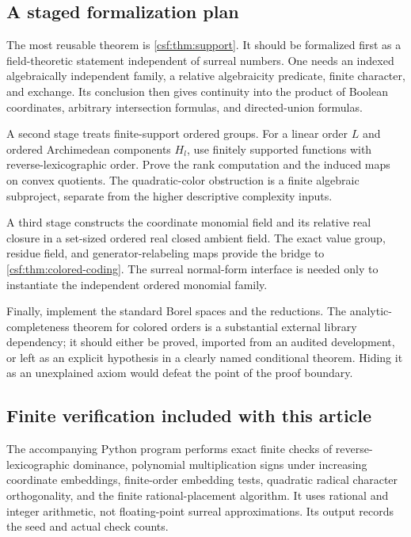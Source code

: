 \documentclass[11pt,a4paper]{article}
\numberwithin{equation}{section}
\theoremstyle{definition}
\theoremstyle{remark}
\begin{document}
\subsection{A staged formalization plan}

The most reusable theorem is \cref{csf:thm:support}. It should be formalized
first as a field-theoretic statement independent of surreal numbers.
One needs an indexed algebraically independent family, a relative
algebraicity predicate, finite character, and exchange. Its conclusion
then gives continuity into the product of Boolean coordinates, arbitrary
intersection formulas, and directed-union formulas.

A second stage treats finite-support ordered groups. For a linear order
$L$ and ordered Archimedean components $H_l$, use finitely supported
functions with reverse-lexicographic order. Prove the rank computation and
the induced maps on convex quotients. The quadratic-color obstruction is
a finite algebraic subproject, separate from the higher descriptive
complexity inputs.

A third stage constructs the coordinate monomial field and its relative
real closure in a set-sized ordered real closed ambient field. The exact
value group, residue field, and generator-relabeling maps provide the
bridge to \cref{csf:thm:colored-coding}. The surreal normal-form interface is
needed only to instantiate the independent ordered monomial family.

Finally, implement the standard Borel spaces and the reductions. The
analytic-completeness theorem for colored orders is a substantial external
library dependency; it should either be proved, imported from an audited
development, or left as an explicit hypothesis in a clearly named
conditional theorem. Hiding it as an unexplained axiom would defeat the
point of the proof boundary.

\subsection{Finite verification included with this article}

The accompanying Python program performs exact finite checks of
reverse-lexicographic dominance, polynomial multiplication signs under
increasing coordinate embeddings, finite-order embedding tests, quadratic
radical character orthogonality, and the finite rational-placement
algorithm. It uses rational and integer arithmetic, not floating-point
surreal approximations. Its output records the seed and actual check
counts.
\end{document}
